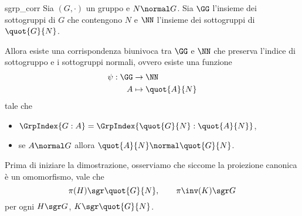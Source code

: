\begin{theorem}
    {sgrp_corr}
    Sia $(G, \cdot)$ un gruppo e $N \normal G$. Sia $\GG$ l'insieme dei sottogruppi di $G$ che contengono $N$ e $\NN$ l'insieme dei sottogruppi di $\quot{G}{N}$.

    Allora esiste una corrispondenza biunivoca tra $\GG$ e $\NN$ che preserva l'indice di sottogruppo e i sottogruppi normali, ovvero esiste una funzione \begin{align*}
        \begin{split}
            \psi : \GG &\to \NN\\
            A &\mapsto \quot{A}{N}
        \end{split}
    \end{align*}    
    tale che \begin{itemize}
        \item $\GrpIndex{G:A} = \GrpIndex{\quot{G}{N} : \quot{A}{N}}$,
        \item se $A \normal G$ allora $\quot{A}{N} \normal \quot{G}{N}$.
    \end{itemize}
\end{theorem}
Prima di iniziare la dimostrazione, osserviamo che siccome la proiezione canonica è un omomorfismo, vale che \[
    \pi(H) \sgr \quot{G}{N}, \qquad \pi\inv(K) \sgr G    
\] per ogni $H \sgr G$, $K \sgr \quot{G}{N}$.
